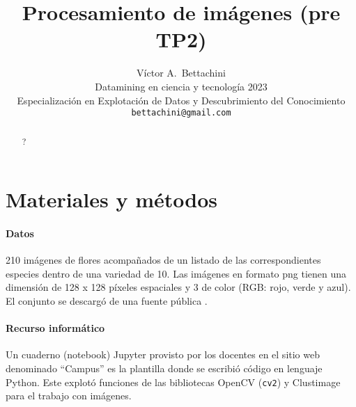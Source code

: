 \documentclass{article}
\title{Procesamiento de imágenes (pre TP2)}
\author{
  Víctor A.~Bettachini\\ %
  Datamining en ciencia y tecnología 2023\\
  Especialización en Explotación de Datos y Descubrimiento del Conocimiento\\
  \texttt{bettachini@gmail.com}
}
\begin{document}
\maketitle


\begin{abstract}
?
\end{abstract}





\section{Materiales y métodos}

\paragraph{Datos}



210 imágenes de flores acompañados de un listado de las correspondientes especies dentro de una variedad de 10.
Las imágenes en formato png tienen una dimensión de 128 x 128 píxeles espaciales y 3 de color (RGB: rojo, verde y azul).
El conjunto se descargó de una fuente pública \cite{belitskaya_flower_2020}.


\paragraph{Recurso informático} 
Un cuaderno (notebook) Jupyter provisto por los docentes en el sitio web denominado ``Campus'' \cite{kamienkowski_curso_2023} es la plantilla donde se escribió código en lenguaje Python.
Este explotó funciones de las bibliotecas OpenCV (\verb'cv2') y Clustimage para el trabajo con imágenes.
\end{document}

